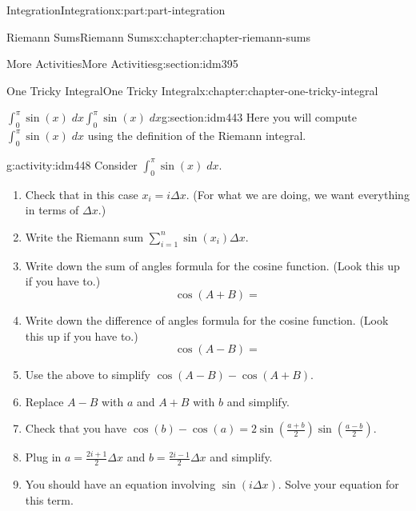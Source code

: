 \documentclass[oneside,10pt,]{book}
\numberwithin{equation}{section}
\begin{document}
\begin{partptx}{Integration}{}{Integration}{}{}{x:part:part-integration}
\begin{chapterptx}{Riemann Sums}{}{Riemann Sums}{}{}{x:chapter:chapter-riemann-sums}
\begin{sectionptx}{More Activities}{}{More Activities}{}{}{g:section:idm395}
\end{sectionptx}
\end{chapterptx}
%
\typeout{************************************************}
\typeout{************************************************}
%
\begin{chapterptx}{One Tricky Integral}{}{One Tricky Integral}{}{}{x:chapter:chapter-one-tricky-integral}
%
%
\typeout{************************************************}
\typeout{************************************************}
%
\begin{sectionptx}{\(\displaystyle \int_0^\pi \sin(x) \; dx\)}{}{\(\displaystyle \int_0^\pi \sin(x) \; dx\)}{}{}{g:section:idm443}
Here you will compute \(\displaystyle \int_0^\pi \sin(x) \; dx\) using the definition of the Riemann integral.%
\begin{activity}{}{g:activity:idm448}%
Consider \(\displaystyle \int_{0}^\pi \sin(x) \; dx\).%
\begin{enumerate}[font=\bfseries,label=(\alph*),ref=\alph*]
\item{}Check that in this case \(x_i = i \Delta x\). (For what we are doing, we want everything in terms of \(\Delta x\).)%
\item{}Write the Riemann sum \(\displaystyle \sum_{i=1}^n \sin(x_i) \Delta x\).%
\item{}Write down the sum of angles formula for the cosine function. (Look this up if you have to.)%
\begin{equation*}
\cos(A+B) = 
\end{equation*}
%
\item{}Write down the difference of angles formula for the cosine function. (Look this up if you have to.)%
\begin{equation*}
\cos(A-B) = 
\end{equation*}
%
\item{}Use the above to simplify \(\cos(A-B) - \cos(A+B)\).%
\item{}Replace \(A-B\) with \(a\) and \(A+B\) with \(b\) and simplify.%
\item{}Check that you have \(\displaystyle \cos(b) - \cos(a) = 2 \sin \left(\frac{a+b}{2}\right) \sin\left(\frac{a-b}{2}\right)\).%
\item{}Plug in \(\displaystyle a = \frac{2i+1}{2} \Delta x\) and \(\displaystyle b = \frac{2i-1}{2}\Delta x\) and simplify.%
\item{}You should have an equation involving \(\sin(i \Delta x)\). Solve your equation for this term.%

\end{enumerate}
\end{activity}
\end{sectionptx}
\end{chapterptx}
\end{partptx}
\end{document}
